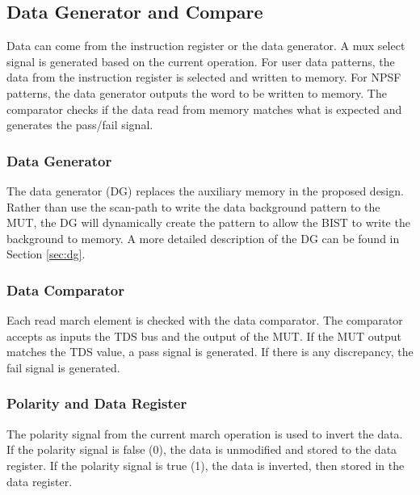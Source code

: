 \subsection{Data Generator and Compare}
\label{sect:bg-blocks-data-generator-and-compare-block}
Data can come from the instruction register or the data generator.  A mux select signal is generated based on the current operation.  For user data patterns, the data from the instruction register is selected and written to memory.  For NPSF patterns, the data generator outputs the word to be written to memory.  The comparator checks if the data read from memory matches what is expected and generates the pass/fail signal.

\subsubsection{Data Generator}
The data generator (DG) replaces the auxiliary memory in the proposed design.  Rather than use the scan-path to write the data background pattern to the MUT, the DG will dynamically create the pattern to allow the BIST to write the background to memory.  A more detailed description of the DG can be found in Section \ref{sec:dg}.

\subsubsection{Data Comparator}
Each read march element is checked with the data comparator.  The comparator accepts as inputs the TDS bus and the output of the MUT.  If the MUT output matches the TDS value, a pass signal is generated.  If there is any discrepancy, the fail signal is generated.  

\subsubsection{Polarity and Data Register}
The polarity signal from the current march operation is used to invert the data.  If the polarity signal is false (0), the data is unmodified and stored to the data register.  If the polarity signal is true (1), the data is inverted, then stored in the data register.  


